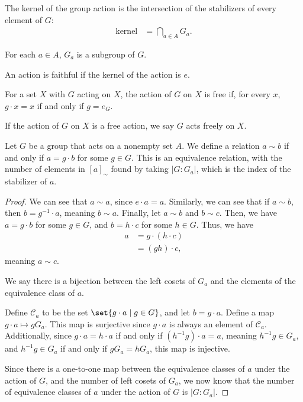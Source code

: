 \documentclass[12pt]{mypackage}
\begin{document}
\begin{note}
  The kernel of the group action is the intersection of the stabilizers of every element of $G$:
  \begin{align*}
    \text{kernel} &= \bigcap_{a\in A}G_a.
  \end{align*}
\end{note}
\begin{note}
  For each $a\in A$, $G_a$ is a subgroup of $G$.
\end{note}
\begin{definition}
  An action is faithful if the kernel of the action is $e$.
\end{definition}
\begin{definition}
  For a set $X$ with $G$ acting on $X$, the action of $G$ on $X$ is free if, for every $x$, $g\cdot x = x$ if and only if $g = e_G$.\newline

  If the action of $G$ on $X$ is a free action, we say $G$ acts freely on $X$.
\end{definition}
\begin{proposition}
  Let $G$ be a group that acts on a nonempty set $A$. We define a relation $a\sim b$ if and only if $a = g\cdot b$ for some $g\in G$. This is an equivalence relation, with the number of elements in $\left[a\right]_{\sim}$ found by taking $\left\vert G:G_a \right\vert$, which is the index of the stabilizer of $a$.
\end{proposition}
\begin{proof}
  We can see that $a\sim a$, since $e\cdot a = a$. Similarly, we can see that if $a\sim b$, then $b = g^{-1}\cdot a$, meaning $b\sim a$. Finally, let $a\sim b$ and $b\sim c$. Then, we have $a = g\cdot b$ for some $g\in G$, and $b = h\cdot c$ for some $h\in G$. Thus, we have
  \begin{align*}
    a &= g\cdot \left(h\cdot c\right)\\
      &= \left(gh\right)\cdot c,
  \end{align*}
  meaning $a\sim c$.\newline

  We say there is a bijection between the left cosets of $G_a$ and the elements of the equivalence class of $a$.\newline

  Define $\mathcal{C}_a$ to be the set $\set{g\cdot a\mid g\in G}$, and let $b = g\cdot a$. Define a map $g\cdot a \mapsto gG_a$. This map is surjective since $g\cdot a$ is always an element of $\mathcal{C}_a$. Additionally, since $g\cdot a = h\cdot a$ if and only if $\left(h^{-1}g\right)\cdot a = a$, meaning $h^{-1}g \in G_a$, and $h^{-1}g\in G_a$ if and only if $gG_a = hG_a$, this map is injective.\newline

  Since there is a one-to-one map between the equivalence classes of $a$ under the action of $G$, and the number of left cosets of $G_a$, we now know that the number of equivalence classes of $a$ under the action of $G$ is $\left\vert G:G_a \right\vert$.
\end{proof}
\end{document}
